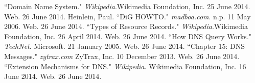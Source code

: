 \documentclass[11pt,a4paper]{article}
\begin{document}
\begin{thebibliography}{15}
\addtolength{\leftmargin}{0.2in}
\setlength{\itemindent}{-0.2in}

     ``Domain Name System." \emph{Wikipedia}.Wikimedia Foundation, Inc. 25 June 2014. Web. 26 June 2014. 
     Heinlein, Paul. ``DiG HOWTO." \emph{madboa.com}. n.p. 11 May 2006. Web. 26 June 2014.
     ``Types of Resource Records." \emph{Wikipedia}.Wikimedia Foundation, Inc. 26 April 2014. Web. 26 June 2014. 
     ``How DNS Query Works." \emph{TechNet}. Microsoft. 21 January 2005. Web. 26 June 2014.
     ``Chapter 15: DNS Messages." \emph{zytrax.com} ZyTrax, Inc. 10 December 2013. Web. 26 June 2014.
     ``Extension Mechanisms for DNS." \emph{Wikipedia}. Wikimedia Foundation, Inc. 16 June 2014. Web. 26 June 2014. 
   
\end{thebibliography}
\end{document}
